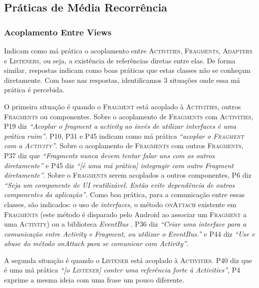 \subsection{Práticas de Média Recorrência}

\subsubsection{Acoplamento Entre Views}
Indicam como má prática o acoplamento entre \textsc{Activities}, \textsc{Fragments}, \textsc{Adapters} e \textsc{Listeners}, ou seja, a existência de referências diretas entre elas. De forma similar, respostas indicam como boas práticas que estas classes não se conheçam diretamente. Com base nas respostas, identificamos 3 situações onde essa má prática é percebida.

O primeira situação é quando o \textsc{Fragment} está acoplado à \textsc{Activities}, outros \textsc{Fragments} ou componentes. Sobre o acoplamento de \textsc{Fragments} com \textsc{Activities}, P19 diz \textit{``Acoplar o fragment a activity ao invés de utilizar interfaces é uma prática ruim''}. P10, P31 e P45 indicam como má prática \textit{``acoplar o \textsc{Fragment} com a \textsc{Activity}''}. Sobre o acoplamento de \textsc{Fragments} com outros \textsc{Fragments}, P37 diz que \textit{``Fragments nunca devem tentar falar uns com os outros diretamente''} e P45 diz \textit{``[é uma má prática] integragir com outro Fragment diretamente''}. Sobre o \textsc{Fragments} serem acoplados a outros componentes, P6 diz \textit{``Seja um componente de UI reutilizável. Então evite dependência de outros componentes da aplicação''}. Como boa prática, para a comunicação entre essas classes, são indicados: o uso de \textit{interfaces}, o método \textsc{onAttach} existente em \textsc{Fragments} (este método é disparado pelo Android ao associar um \textsc{Fragment} a uma \textsc{Activity}) ou a biblioteca \textit{EventBus} \cite{EventBusAndroid}. P36 diz \textit{``Criar uma interface para a comunicação entre Activity e Fragment, ou utilizar o EventBus.''} e P44 diz \textit{``Use e abuse do método onAttach para se comunicar com Activity''}. 

A segunda situação é quando o \textsc{Listener} está acoplado à \textsc{Activities}. P40 diz que é uma má prática \textit{``[o \textsc{Listener}] conter uma referência forte à Activities''}, P4 exprime a mesma ideia com uma frase um pouco diferente. 

